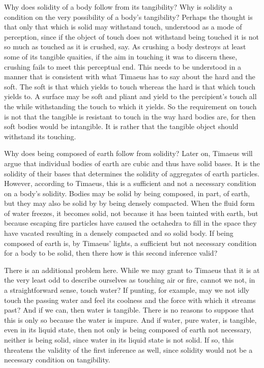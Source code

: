Why does solidity of a body follow from its tangibility? Why is solidity a condition on the very possibility of a body's tangibility? Perhaps the thought is that only that which is solid may withstand touch, understood as a mode of perception, since if the object of touch does not withstand being touched it is not so much as touched as it is crushed, say. As crushing a body destroys at least some of its tangible quaities, if the aim in touching it was to discern these, crushing fails to meet this perceptual end. This needs to be understood in a manner that is consistent with what Timaeus has to say about the hard and the soft. The soft is that which yields to touch whereas the hard is that which touch yields to. A surface may be soft and pliant and yield to the percipient's touch all the while withstanding the touch to which it yields. So the requirement on touch is not that the tangible is resistant to touch in the way hard bodies are, for then soft bodies would be intangible. It is rather that the tangible object should withstand its touching.

Why does being composed of earth follow from solidity? Later on, Timaeus will argue that individual bodies of earth are cubic and thus have solid bases. It is the solidity of their bases that determines the solidity of aggregates of earth particles. However, according to Timaeus, this is a sufficient and not a necessary condition on a body's solidity. Bodies may be solid by being composed, in part, of earth, but they may also be solid by by being densely compacted. When the fluid form of water freezes, it becomes solid, not because it has been tainted with earth, but because escaping fire particles have caused the octahedra to fill in the space they have vacated resulting in a densely compacted and so solid body. If being composed of earth is, by Timaeus' lights, a sufficient but not necessary condition for a body to be solid, then there how is this second inference valid?

There is an additional problem here. While we may grant to Timaeus that it is at the very least odd to describe ourselves as touching air or fire, cannot we not, in a straightforward sense, touch water? If punting, for example, may we not idly touch the passing water and feel its coolness and the force with which it streams past? And if we can, then water is tangible. There is no reasons to suppose that this is only so because the water is impure.  And if water, pure water, is tangible, even in its liquid state, then not only is being composed of earth not necessary, neither is being solid, since water in its liquid state is not solid. If so, this threatens the validity of the first inference as well, since solidity would not be a necessary condition on tangibility.

